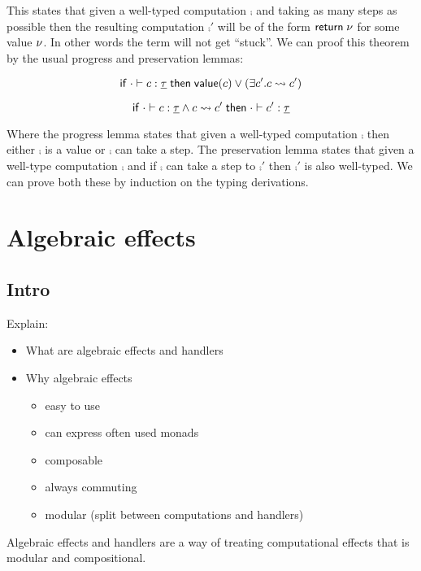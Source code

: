 {This states that given a well-typed computation $\comp$ and taking as many steps as possible then the resulting computation $\comp'$ will be of the form
$\mathsf{return} \; \nu$ for some value $\nu$. In other words the term will not get ``stuck''.
We can proof this theorem by the usual progress and preservation lemmas:

\begin{lemma}[Progress]
\[
	\mathsf{if}\;
		\cdot \vdash c : \underline{\tau}
	\;\mathsf{then}\;
		\mathsf{value}(c)
		\lor
		(\exists c'. c \rightsquigarrow c')
\]
\end{lemma}

\begin{lemma}[Preservation]
\[
	\mathsf{if}\;
		\cdot \vdash c : \underline{\tau}
		\land
		c \rightsquigarrow c'
	\;\mathsf{then}\;
		\cdot \vdash c' : \underline{\tau}
\]
\end{lemma}

Where the progress lemma states that given a well-typed computation $\comp$ then either $\comp$ is a value or $\comp$ can take a  step. The preservation lemma states that given a well-type computation $\comp$ and if $\comp$ can take a step to $\comp'$ then $\comp'$ is also well-typed. We can prove both these by induction on the typing derivations.

\newpage
\section{Algebraic effects}

\subsection{Intro}
Explain:
\begin{itemize}
	\item What are algebraic effects and handlers
	\item Why algebraic effects
	\begin{itemize}
		\item easy to use
		\item can express often used monads
		\item composable
		\item always commuting
		\item modular (split between computations and handlers)
	\end{itemize}
\end{itemize}

Algebraic effects and handlers are a way of treating computational effects that is modular and compositional.

}

